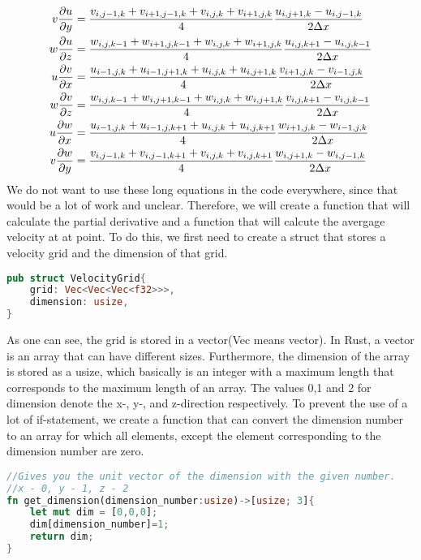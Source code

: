 \documentclass{article}
\begin{document}
\[\begin{split}
  v\pdv{u}{y}&=\frac{v_{i,j-1,k}+v_{i+1,j-1,k}+v_{i,j,k}+v_{i+1,j,k}}{4}\frac{u_{i,j+1,k}-u_{i,j-1,k}}{2\Delta x}\\
  w\pdv{u}{z}&=\frac{w_{i,j,k-1}+w_{i+1,j,k-1}+w_{i,j,k}+w_{i+1,j,k}}{4}\frac{u_{i,j,k+1}-u_{i,j,k-1}}{2\Delta x}\\
  u\pdv{v}{x}&=\frac{u_{i-1,j,k}+u_{i-1,j+1,k}+u_{i,j,k}+u_{i,j+1,k}}{4}\frac{v_{i+1,j,k}-v_{i-1,j,k}}{2\Delta x}\\
  w\pdv{v}{z}&=\frac{w_{i,j,k-1}+w_{i,j+1,k-1}+w_{i,j,k}+w_{i,j+1,k}}{4}\frac{v_{i,j,k+1}-v_{i,j,k-1}}{2\Delta x}\\
  u\pdv{w}{x}&=\frac{u_{i-1,j,k}+u_{i-1,j,k+1}+u_{i,j,k}+u_{i,j,k+1}}{4}\frac{w_{i+1,j,k}-w_{i-1,j,k}}{2\Delta x}\\
  v\pdv{w}{y}&=\frac{v_{i,j-1,k}+v_{i,j-1,k+1}+v_{i,j,k}+v_{i,j,k+1}}{4}\frac{w_{i,j+1,k}-w_{i,j-1,k}}{2\Delta x}\\
\end{split}
\] \label{average and partial}
We do not want to use these long equations in the code everywhere, since that would be a lot of work and unclear. Therefore, we will create a function that will calculate the partial derivative and a function that will calcute the avergage velocity at at point. To do this, we first need to create a struct that stores a velocity grid and the dimension of that grid.

\begin{lstlisting}[language=Rust, style=boxed, breaklines=true]
pub struct VelocityGrid{
    grid: Vec<Vec<Vec<f32>>>,
    dimension: usize,
}
\end{lstlisting}
As one can see, the grid is stored in a vector(Vec means vector). In Rust, a vector is an array that can have different sizes. Furthermore, the dimension of the array is stored as a usize, which basically is an integer with a maximum length that corresponds to the maximum length of an array. The values 0,1 and 2 for dimension denote the x-, y-, and z-direction respectively. To prevent the use of a lot of if-statement, we create a function that can convert the dimension number to an array for which all elements, except the element corresponding to the dimension number are zero. 
\begin{lstlisting}[language=Rust, style=boxed, breaklines=true]
//Gives you the unit vector of the dimension with the given number.
//x - 0, y - 1, z - 2
fn get_dimension(dimension_number:usize)->[usize; 3]{
    let mut dim = [0,0,0];
    dim[dimension_number]=1;
    return dim;
}
\end{lstlisting}
\end{document}
